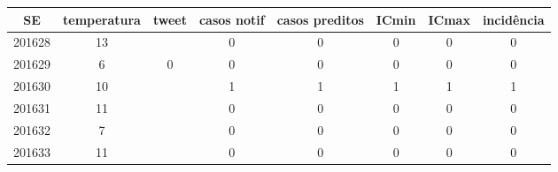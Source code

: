 \begin{tabular}{c|ccccccc}
  \hline
SE & temperatura & tweet & casos notif & casos preditos & ICmin & ICmax & incidência \\ 
  \hline
201628 & 13 &  & 0 & 0 & 0 & 0 & 0 \\ 
  201629 & 6 & 0 & 0 & 0 & 0 & 0 & 0 \\ 
  201630 & 10 &  & 1 & 1 & 1 & 1 & 1 \\ 
  201631 & 11 &  & 0 & 0 & 0 & 0 & 0 \\ 
  201632 & 7 &  & 0 & 0 & 0 & 0 & 0 \\ 
  201633 & 11 &  & 0 & 0 & 0 & 0 & 0 \\ 
   \hline
\end{tabular}
